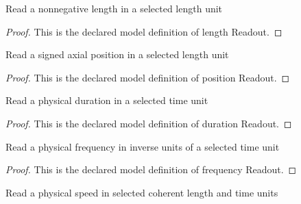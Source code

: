 \begin{definition}
  \label{def:physics:phyx-mini-0310:phyxminiproblems-problemphyxmini0310-lengthreadout}
  Read a nonnegative length in a selected length unit
\end{definition}
\begin{proof}
  This is the declared model definition of length Readout.
\end{proof}
\begin{definition}
  \label{def:physics:phyx-mini-0310:phyxminiproblems-problemphyxmini0310-positionreadout}
  Read a signed axial position in a selected length unit
\end{definition}
\begin{proof}
  This is the declared model definition of position Readout.
\end{proof}
\begin{definition}
  \label{def:physics:phyx-mini-0310:phyxminiproblems-problemphyxmini0310-durationreadout}
  Read a physical duration in a selected time unit
\end{definition}
\begin{proof}
  This is the declared model definition of duration Readout.
\end{proof}
\begin{definition}
  \label{def:physics:phyx-mini-0310:phyxminiproblems-problemphyxmini0310-frequencyreadout}
  Read a physical frequency in inverse units of a selected time unit
\end{definition}
\begin{proof}
  This is the declared model definition of frequency Readout.
\end{proof}
\begin{definition}
  \label{def:physics:phyx-mini-0310:phyxminiproblems-problemphyxmini0310-speedreadout}
  Read a physical speed in selected coherent length and time units
\end{definition}
